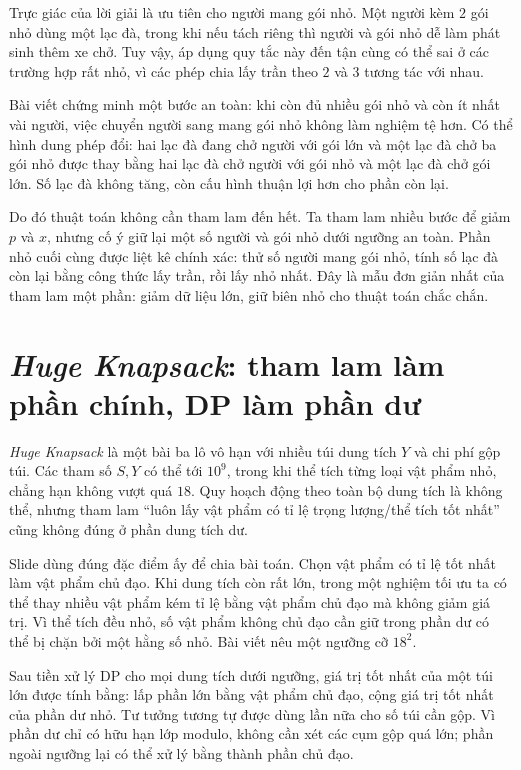 \documentclass[11pt]{article}
\begin{document}
Trực giác của lời giải là ưu tiên cho người mang gói nhỏ. Một người kèm
\(2\) gói nhỏ dùng một lạc đà, trong khi nếu tách riêng thì người và gói nhỏ
dễ làm phát sinh thêm xe chở. Tuy vậy, áp dụng quy tắc này đến tận cùng có
thể sai ở các trường hợp rất nhỏ, vì các phép chia lấy trần theo \(2\) và
\(3\) tương tác với nhau.

Bài viết chứng minh một bước an toàn: khi còn đủ nhiều gói nhỏ và còn ít nhất
vài người, việc chuyển người sang mang gói nhỏ không làm nghiệm tệ hơn. Có
thể hình dung phép đổi: hai lạc đà đang chở người với gói lớn và một lạc đà
chở ba gói nhỏ được thay bằng hai lạc đà chở người với gói nhỏ và một lạc đà
chở gói lớn. Số lạc đà không tăng, còn cấu hình thuận lợi hơn cho phần còn
lại.

Do đó thuật toán không cần tham lam đến hết. Ta tham lam nhiều bước để giảm
\(p\) và \(x\), nhưng cố ý giữ lại một số người và gói nhỏ dưới ngưỡng an
toàn. Phần nhỏ cuối cùng được liệt kê chính xác: thử số người mang gói nhỏ,
tính số lạc đà còn lại bằng công thức lấy trần, rồi lấy nhỏ nhất. Đây là mẫu
đơn giản nhất của tham lam một phần: giảm dữ liệu lớn, giữ biên nhỏ cho thuật
toán chắc chắn.

\section{\textit{Huge Knapsack}: tham lam làm phần chính, DP làm phần dư}

\textit{Huge Knapsack} là một bài ba lô vô hạn với nhiều túi dung tích \(Y\)
và chi phí gộp túi. Các tham số \(S,Y\) có thể tới \(10^9\), trong khi thể
tích từng loại vật phẩm nhỏ, chẳng hạn không vượt quá \(18\). Quy hoạch động
theo toàn bộ dung tích là không thể, nhưng tham lam ``luôn lấy vật phẩm có tỉ
lệ trọng lượng/thể tích tốt nhất'' cũng không đúng ở phần dung tích dư.

Slide dùng đúng đặc điểm ấy để chia bài toán. Chọn vật phẩm có tỉ lệ tốt nhất
làm vật phẩm chủ đạo. Khi dung tích còn rất lớn, trong một nghiệm tối ưu ta
có thể thay nhiều vật phẩm kém tỉ lệ bằng vật phẩm chủ đạo mà không giảm giá
trị. Vì thể tích đều nhỏ, số vật phẩm không chủ đạo cần giữ trong phần dư có
thể bị chặn bởi một hằng số nhỏ. Bài viết nêu một ngưỡng cỡ \(18^2\).

Sau tiền xử lý DP cho mọi dung tích dưới ngưỡng, giá trị tốt nhất của một túi
lớn được tính bằng: lấp phần lớn bằng vật phẩm chủ đạo, cộng giá trị tốt nhất
của phần dư nhỏ. Tư tưởng tương tự được dùng lần nữa cho số túi cần gộp. Vì
phần dư chỉ có hữu hạn lớp modulo, không cần xét các cụm gộp quá lớn; phần
ngoài ngưỡng lại có thể xử lý bằng thành phần chủ đạo.
\end{document}
